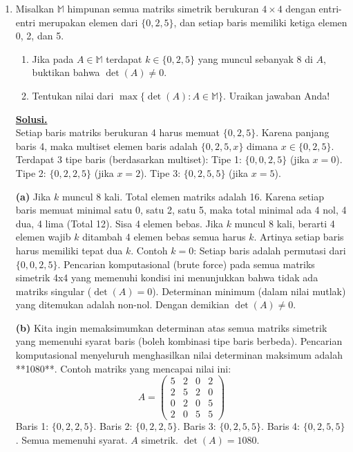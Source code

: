 \documentclass[12pt,twoside]{article}
\newenvironment{solution}
{
	\par\noindent\textbf{\underline{Solusi.}}\\
}
{
	\par
}
\begin{document}
\begin{enumerate}
  \item Misalkan $\mathbb{M}$ himpunan semua matriks simetrik berukuran $4 \times 4$ dengan entri-entri merupakan elemen dari $\{0,2,5\}$, dan setiap baris memiliki ketiga elemen 0, 2, dan 5.

        \begin{enumerate}
          \item Jika pada $A \in \mathbb{M}$ terdapat $k \in \{0,2,5\}$ yang muncul sebanyak 8 di $A$, buktikan bahwa $\det(A) \ne 0$.
          \item Tentukan nilai dari $\max\{\det(A) : A \in \mathbb{M}\}$. Uraikan jawaban Anda!
        \end{enumerate}
        \begin{solution}
          Setiap baris matriks berukuran 4 harus memuat $\{0, 2, 5\}$. Karena panjang baris 4, maka multiset elemen baris adalah $\{0, 2, 5, x\}$ dimana $x \in \{0,2,5\}$.
          Terdapat 3 tipe baris (berdasarkan multiset):
          Tipe 1: $\{0, 0, 2, 5\}$ (jika $x=0$).
          Tipe 2: $\{0, 2, 2, 5\}$ (jika $x=2$).
          Tipe 3: $\{0, 2, 5, 5\}$ (jika $x=5$).

          \textbf{(a)} Jika $k$ muncul 8 kali. Total elemen matriks adalah 16.
          Karena setiap baris memuat minimal satu 0, satu 2, satu 5, maka total minimal ada 4 nol, 4 dua, 4 lima (Total 12).
          Sisa 4 elemen bebas.
          Jika $k$ muncul 8 kali, berarti 4 elemen wajib $k$ ditambah 4 elemen bebas semua harus $k$.
          Artinya setiap baris harus memiliki tepat dua $k$.
          Contoh $k=0$: Setiap baris adalah permutasi dari $\{0, 0, 2, 5\}$.
          Pencarian komputasional (brute force) pada semua matriks simetrik 4x4 yang memenuhi kondisi ini menunjukkan bahwa tidak ada matriks singular ($\det(A)=0$).
          Determinan minimum (dalam nilai mutlak) yang ditemukan adalah non-nol.
          Dengan demikian $\det(A) \ne 0$.

          \textbf{(b)} Kita ingin memaksimumkan determinan atas semua matriks simetrik yang memenuhi syarat baris (boleh kombinasi tipe baris berbeda).
          Pencarian komputasional menyeluruh menghasilkan nilai determinan maksimum adalah **1080**.
          Contoh matriks yang mencapai nilai ini:
          \[ A = \begin{pmatrix}
              5 & 2 & 0 & 2 \\
              2 & 5 & 2 & 0 \\
              0 & 2 & 0 & 5 \\
              2 & 0 & 5 & 5
            \end{pmatrix} \]
          Baris 1: $\{0, 2, 2, 5\}$. Baris 2: $\{0, 2, 2, 5\}$. Baris 3: $\{0, 2, 5, 5\}$. Baris 4: $\{0, 2, 5, 5\}$.
          Semua memenuhi syarat. $A$ simetrik.
          $\det(A) = 1080$.
        \end{solution}


\end{enumerate}
\end{document}

